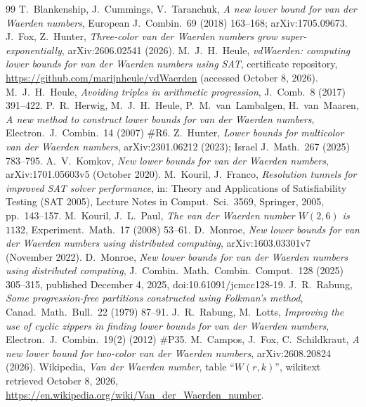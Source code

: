 \documentclass[11pt]{article}
\numberwithin{equation}{section}
\theoremstyle{definition}
\theoremstyle{remark}
\begin{document}
\begin{thebibliography}{99}
 T.~Blankenship, J.~Cummings, V.~Taranchuk, \emph{A new lower bound for van der
Waerden numbers}, European J.\ Combin.\ 69 (2018) 163--168; arXiv:1705.09673.
 J.~Fox, Z.~Hunter, \emph{Three-color van der Waerden numbers grow super-exponentially},
arXiv:2606.02541 (2026).
 M.~J.~H.~Heule, \emph{vdWaerden: computing lower bounds for van der Waerden
numbers using SAT}, certificate repository, \url{https://github.com/marijnheule/vdWaerden}
(accessed October 8, 2026).
 M.~J.~H.~Heule, \emph{Avoiding triples in arithmetic progression}, J.\ Comb.\ 8
(2017) 391--422.
 P.~R.~Herwig, M.~J.~H.~Heule, P.~M.~van~Lambalgen, H.~van~Maaren, \emph{A new
method to construct lower bounds for van der Waerden numbers}, Electron.\ J.\ Combin.\ 14 (2007)
\#R6.
 Z.~Hunter, \emph{Lower bounds for multicolor van der Waerden numbers},
arXiv:2301.06212 (2023); Israel J.\ Math.\ 267 (2025) 783--795.
 A.~V.~Komkov, \emph{New lower bounds for van der Waerden numbers},
arXiv:1701.05603v5 (October 2020).
 M.~Kouril, J.~Franco, \emph{Resolution tunnels for improved SAT solver
performance}, in: Theory and Applications of Satisfiability Testing (SAT 2005), Lecture Notes in
Comput.\ Sci.\ 3569, Springer, 2005, pp.~143--157.
 M.~Kouril, J.~L.~Paul, \emph{The van der Waerden number $W(2,6)$ is $1132$},
Experiment.\ Math.\ 17 (2008) 53--61.
 D.~Monroe, \emph{New lower bounds for van der Waerden numbers using distributed
computing}, arXiv:1603.03301v7 (November 2022).
 D.~Monroe, \emph{New lower bounds for van der Waerden numbers using distributed
computing}, J.\ Combin.\ Math.\ Combin.\ Comput.\ 128 (2025) 305--315, published December 4, 2025,
doi:10.61091/jcmcc128-19.
 J.~R.~Rabung, \emph{Some progression-free partitions constructed using Folkman's
method}, Canad.\ Math.\ Bull.\ 22 (1979) 87--91.
 J.~R.~Rabung, M.~Lotts, \emph{Improving the use of cyclic zippers in finding lower
bounds for van der Waerden numbers}, Electron.\ J.\ Combin.\ 19(2) (2012) \#P35.
 M.~Campos, J.~Fox, C.~Schildkraut, \emph{A new lower bound for two-color van der Waerden numbers},
arXiv:2608.20824 (2026).
 Wikipedia, \emph{Van der Waerden number}, table ``$W(r,k)$'', wikitext retrieved
October 8, 2026, \url{https://en.wikipedia.org/wiki/Van_der_Waerden_number}.
\end{thebibliography}
\end{document}
